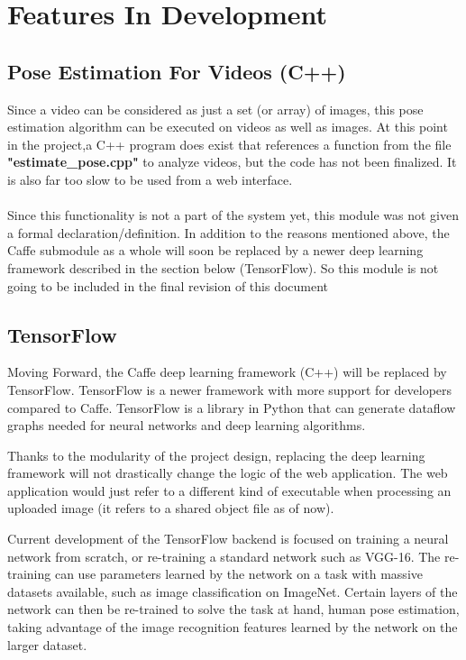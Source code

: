 \documentclass{scrreprt}
\begin{document}
\break

\section{Features In Development}

\subsection{Pose Estimation For Videos (C++)}

Since a video can be considered as just a set (or array) of images, this pose estimation algorithm can be executed on videos as well as images. At this point in the project,a C++ program does exist that references a function from the file \textbf{"estimate\_pose.cpp"} to analyze videos, but the code has not been finalized. It is also far too slow to be used from a web interface.
\\\\
Since this functionality is not a part of the system yet, this module was not given a formal declaration/definition. In addition to the reasons mentioned above, the Caffe submodule as a whole will soon be replaced by a newer deep learning framework described in the section below (TensorFlow). So this module is not going to be included in the final revision of this document

\subsection{TensorFlow}

Moving Forward, the Caffe deep learning framework (C++) will be replaced by
TensorFlow. TensorFlow is a newer framework with more support for developers
compared to Caffe. TensorFlow is a library in Python that can generate dataflow
graphs needed for neural networks and deep learning algorithms.

Thanks to the modularity of the project design, replacing the deep learning
framework will not drastically change the logic of the web application. The web
application would just refer to a different kind of executable when processing
an uploaded image (it refers to a shared object file as of now).

Current development of the TensorFlow backend is focused on training a neural
network from scratch, or re-training a standard network such as VGG-16. The
re-training can use parameters learned by the network on a task with massive
datasets available, such as image classification on ImageNet. Certain layers of
the network can then be re-trained to solve the task at hand, human pose
estimation, taking advantage of the image recognition features learned by the
network on the larger dataset.
\end{document}
